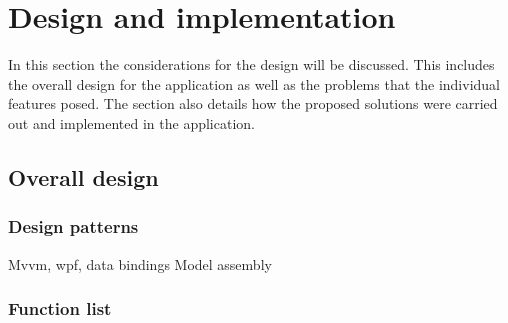 \section{Design and implementation}

In this section the considerations for the
design will be discussed. This includes the overall design for the application
as well as the problems that the individual features posed. The section also
details how the proposed solutions were carried out and implemented in the
application.

\subsection{Overall design}
\subsubsection{Design patterns}

Mvvm, wpf, data bindings Model assembly

\subsubsection{Function list}


